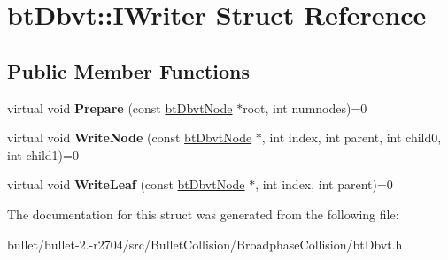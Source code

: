 \hypertarget{structbt_dbvt_1_1_i_writer}{\section{bt\+Dbvt\+:\+:I\+Writer Struct Reference}
\label{structbt_dbvt_1_1_i_writer}
}
\subsection*{Public Member Functions}
\begin{DoxyCompactItemize}
\item 
\hypertarget{structbt_dbvt_1_1_i_writer_a97856d5adb23bd8c9b5e451cb974d425}{virtual void {\bfseries Prepare} (const \hyperlink{structbt_dbvt_node}{bt\+Dbvt\+Node} $\ast$root, int numnodes)=0}\label{structbt_dbvt_1_1_i_writer_a97856d5adb23bd8c9b5e451cb974d425}

\item 
\hypertarget{structbt_dbvt_1_1_i_writer_ad636dcb98208311c00a9d3cf6e91c652}{virtual void {\bfseries Write\+Node} (const \hyperlink{structbt_dbvt_node}{bt\+Dbvt\+Node} $\ast$, int index, int parent, int child0, int child1)=0}\label{structbt_dbvt_1_1_i_writer_ad636dcb98208311c00a9d3cf6e91c652}

\item 
\hypertarget{structbt_dbvt_1_1_i_writer_a55561c4dee82cc69ceb13544ecaf347a}{virtual void {\bfseries Write\+Leaf} (const \hyperlink{structbt_dbvt_node}{bt\+Dbvt\+Node} $\ast$, int index, int parent)=0}\label{structbt_dbvt_1_1_i_writer_a55561c4dee82cc69ceb13544ecaf347a}

\end{DoxyCompactItemize}


The documentation for this struct was generated from the following file\+:\begin{DoxyCompactItemize}
\item 
bullet/bullet-\/2.-\/r2704/src/\+Bullet\+Collision/\+Broadphase\+Collision/bt\+Dbvt.\+h\end{DoxyCompactItemize}
